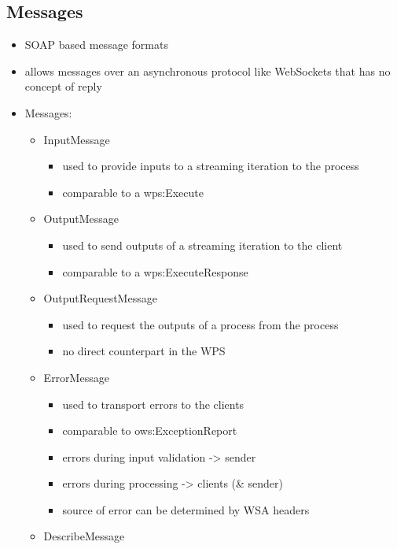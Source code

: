 	\subsection{Messages}
		\begin{itemize}
			\item SOAP based message formats
			\item allows messages over an asynchronous protocol like WebSockets that has no concept of reply
			\item Messages:
			\begin{itemize}
				\item InputMessage

				\begin{itemize}
					\item used to provide inputs to a streaming iteration to the process
					\item comparable to a wps:Execute
				\end{itemize}
				\item OutputMessage

				\begin{itemize}
					\item used to send outputs of a streaming iteration to the client
					\item comparable to a wps:ExecuteResponse
				\end{itemize}
				\item OutputRequestMessage

				\begin{itemize}
					\item used to request the outputs of a process from the process
					\item no direct counterpart in the WPS
				\end{itemize}
				\item ErrorMessage

				\begin{itemize}
					\item used to transport errors to the clients
					\item comparable to ows:ExceptionReport
					\item errors during input validation -> sender
					\item errors during processing -> clients (\& sender)
					\item source of error can be determined by WSA headers
				\end{itemize}
				\item DescribeMessage


\end{itemize}
\end{itemize}
